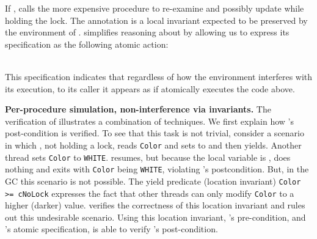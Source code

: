 If ,  calls the more expensive procedure  to re-examine and possibly update  while holding the lock. 
The annotation   is a local invariant expected to be preserved by the environment of . 
\civl simplifies reasoning about  by allowing us to express its specification as the following atomic action:\\
\begin{footnotesize}
\begin{tt}
[if (Color <= WHITE)  Color := GRAY]
\end{tt}
\end{footnotesize}\\
This specification indicates that regardless of how the environment interferes with its execution, to its caller it appears as if  atomically executes the code above. 

{\bf Per-procedure simulation, non-interference via invariants.}
The verification of  illustrates a combination of techniques. 
We first explain how 's post-condition is verified. 
To see that this task is not trivial, consider a scenario in which , not holding a lock, reads {\tt Color} and sets  to  and then yields. 
Another thread sets {\tt Color} to {\tt WHITE}. 
 resumes, but because the local variable  is , does nothing and exits with {\tt Color} being {\tt WHITE}, violating 's postcondition. 
But, in the GC this scenario is not possible. 
The yield predicate (location invariant) {\tt Color >= cNoLock} expresses the fact that other threads can only modify {\tt Color} to a higher (darker) value. 
\civl verifies the correctness of this location invariant and rules out this undesirable scenario. 
Using this location invariant, 's pre-condition, and 's atomic specification, \civl is able to verify 's post-condition. 

